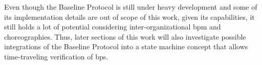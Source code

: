 Even though the Baseline Protocol is still under heavy development and some of its implementation details are out of scope of this work, given its capabilities, it still holds a lot of potential considering inter-organizational \gls{bpm} and choreographies. Thus, later sections of this work will also investigate possible integrations of the Baseline Protocol into a state machine concept that allows time-traveling verification of \glspl{bp}.
